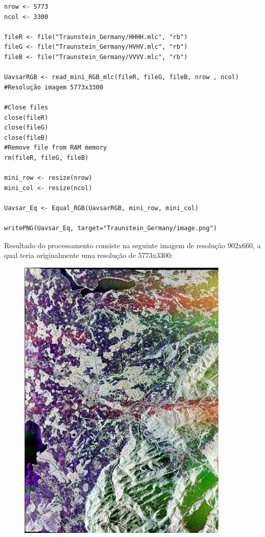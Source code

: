 \documentclass[12pt]{article}
\begin{document}
\begin{verbatim}
nrow <- 5773
ncol <- 3300

fileR <- file("Traunstein_Germany/HHHH.mlc", "rb")
fileG <- file("Traunstein_Germany/HVHV.mlc", "rb")
fileB <- file("Traunstein_Germany/VVVV.mlc", "rb")

UavsarRGB <- read_mini_RGB_mlc(fileR, fileG, fileB, nrow , ncol) #Resolução imagem 5773x3300

#Close files
close(fileR)
close(fileG)
close(fileB)
#Remove file from RAM memory
rm(fileR, fileG, fileB)

mini_row <- resize(nrow)
mini_col <- resize(ncol)

Uavsar_Eq <- Equal_RGB(UavsarRGB, mini_row, mini_col)

writePNG(Uavsar_Eq, target="Traunstein_Germany/image.png")

\end{verbatim}

Resultado do processamento consiste na seguinte imagem de resolução 902x660, a qual teria originalmente uma resolução de 5773x3300:

\begin{figure}[!ht]
	\begin{center}
		\includegraphics[width = 100mm, scale = 0.5]{image}
	\end{center}
\end{figure}
\end{document}
